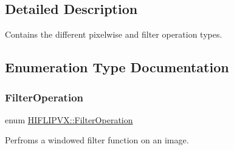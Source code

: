 \subsection{Detailed Description}
Contains the different pixelwise and filter operation types. 

\subsection{Enumeration Type Documentation}
\mbox{\label{namespace_h_i_f_l_i_p_v_x_a62626da15d80d073221df1590163df57}} 
\subsubsection{\texorpdfstring{Filter\+Operation}{FilterOperation}}
{\footnotesize\ttfamily enum \hyperlink{namespace_h_i_f_l_i_p_v_x_a62626da15d80d073221df1590163df57}{H\+I\+F\+L\+I\+P\+V\+X\+::\+Filter\+Operation}}



Perfroms a windowed filter function on an image. 

